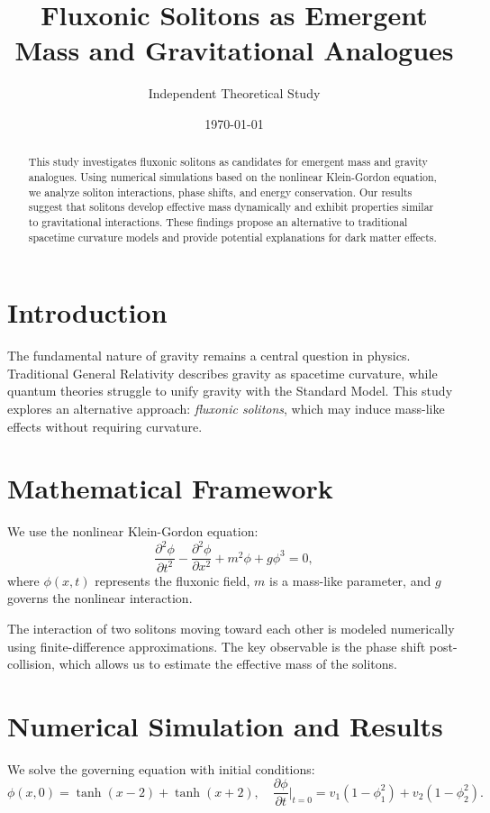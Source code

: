 \documentclass{article}
\title{Fluxonic Solitons as Emergent Mass and Gravitational Analogues}
\author{Independent Theoretical Study}
\date{\today}
\begin{document}
\maketitle

\begin{abstract}
This study investigates fluxonic solitons as candidates for emergent mass and gravity analogues. Using numerical simulations based on the nonlinear Klein-Gordon equation, we analyze soliton interactions, phase shifts, and energy conservation. Our results suggest that solitons develop effective mass dynamically and exhibit properties similar to gravitational interactions. These findings propose an alternative to traditional spacetime curvature models and provide potential explanations for dark matter effects.
\end{abstract}

\section{Introduction}
The fundamental nature of gravity remains a central question in physics. Traditional General Relativity describes gravity as spacetime curvature, while quantum theories struggle to unify gravity with the Standard Model. This study explores an alternative approach: \textit{fluxonic solitons}, which may induce mass-like effects without requiring curvature.

\section{Mathematical Framework}
We use the nonlinear Klein-Gordon equation:
\begin{equation}
    \frac{\partial^2 \phi}{\partial t^2} - \frac{\partial^2 \phi}{\partial x^2} + m^2 \phi + g \phi^3 = 0,
\end{equation}
where $\phi(x,t)$ represents the fluxonic field, $m$ is a mass-like parameter, and $g$ governs the nonlinear interaction.

The interaction of two solitons moving toward each other is modeled numerically using finite-difference approximations. The key observable is the phase shift post-collision, which allows us to estimate the effective mass of the solitons.

\section{Numerical Simulation and Results}
We solve the governing equation with initial conditions:
\begin{equation}
    \phi(x,0) = \tanh(x - 2) + \tanh(x + 2), \quad \frac{\partial \phi}{\partial t} \Big|_{t=0} = v_1 (1 - \phi_1^2) + v_2 (1 - \phi_2^2).
\end{equation}
\end{document}
